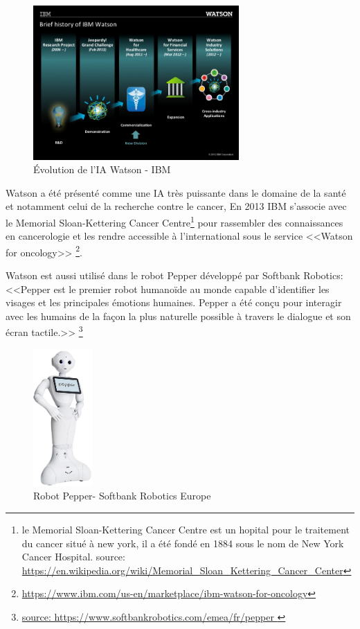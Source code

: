 \begin{figure}[H]
    \centering
    \includegraphics[width=0.7\textwidth]{Images/historyofwatson}
    \caption{Évolution de l'IA Watson - IBM}
    \label{fig:historyofwatson}
\end{figure}


Watson a été présenté comme une IA très puissante dans le domaine de la santé et notamment 
celui de la recherche contre le cancer, En 2013 IBM s'associe avec 
le Memorial Sloan-Kettering Cancer Centre\footnote{
    le Memorial Sloan-Kettering Cancer Centre est un hopital pour le traitement du cancer situé à new 
    york, il a été fondé en 1884 sous le nom de New York Cancer Hospital. \newline 
    source: \url{https://en.wikipedia.org/wiki/Memorial_Sloan_Kettering_Cancer_Center}

} pour rassembler des connaissances en 
cancerologie et les rendre accessible à l'international sous le service <<Watson for oncology>>
\footnote{\url{https://www.ibm.com/us-en/marketplace/ibm-watson-for-oncology}}. \newline 

Watson est aussi utilisé dans le robot Pepper développé par Softbank Robotics:
<<Pepper est le premier robot humanoïde au monde capable d'identifier les visages et 
les principales émotions humaines. Pepper a été conçu pour interagir avec 
les humains de la façon la plus naturelle possible à travers le dialogue et son écran tactile.>> 
\footnote{\url{ source: https://www.softbankrobotics.com/emea/fr/pepper }} \newline

\begin{figure}[H]
    \centering
    \includegraphics[width=0.2\textwidth]{Images/pepper}
    \caption{Robot Pepper- Softbank Robotics Europe}
    \label{fig:pepperrobot}
\end{figure}

